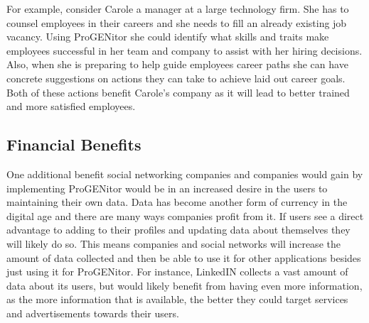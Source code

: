 		For example, consider Carole a manager at a large technology firm.  She has
	to counsel employees in their careers and she needs to fill an already
	existing job vacancy.  Using ProGENitor she could identify what skills and
	traits make employees successful in her team and company to assist with her
	hiring decisions.  Also, when she is preparing to help guide employees career
	paths she can have concrete suggestions on actions they can take to achieve
	laid out career goals.  Both of these actions benefit Carole's company as it
	will lead to better trained and more satisfied employees.
\subsection{Financial Benefits}
		One additional benefit social networking companies and companies would gain by
	implementing ProGENitor would be in an increased desire in the users to
	maintaining their own data.  Data has become another form of currency in the
	digital age and there are many ways companies profit from it.  If users see a
	direct advantage to adding to their profiles and updating data about themselves
	they will likely do so.  This means companies and social networks will increase
	the amount of data collected and then be able to use it for other applications
	besides just using it for ProGENitor.  For instance, LinkedIN collects a vast
	amount of data about its users, but would likely benefit from having even more
	information, as the more information that is available, the better they could
	target services and advertisements towards their users.
